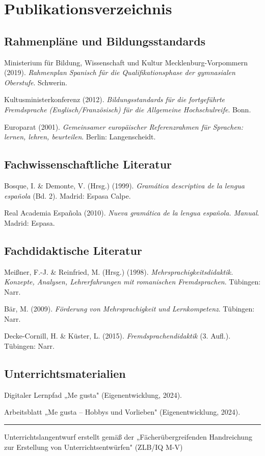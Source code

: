 \documentclass[11pt, a4paper]{article}
\begin{document}

\section{Publikationsverzeichnis}

\subsection*{Rahmenpläne und Bildungsstandards}

Ministerium für Bildung, Wissenschaft und Kultur Mecklenburg-Vorpommern (2019). \textit{Rahmenplan Spanisch für die Qualifikationsphase der gymnasialen Oberstufe}. Schwerin.

Kultusministerkonferenz (2012). \textit{Bildungsstandards für die fortgeführte Fremdsprache (Englisch/Französisch) für die Allgemeine Hochschulreife}. Bonn.

Europarat (2001). \textit{Gemeinsamer europäischer Referenzrahmen für Sprachen: lernen, lehren, beurteilen}. Berlin: Langenscheidt.

\subsection*{Fachwissenschaftliche Literatur}

Bosque, I. \& Demonte, V. (Hrsg.) (1999). \textit{Gramática descriptiva de la lengua española} (Bd. 2). Madrid: Espasa Calpe.

Real Academia Española (2010). \textit{Nueva gramática de la lengua española. Manual}. Madrid: Espasa.

\subsection*{Fachdidaktische Literatur}

Meißner, F.-J. \& Reinfried, M. (Hrsg.) (1998). \textit{Mehrsprachigkeitsdidaktik. Konzepte, Analysen, Lehrerfahrungen mit romanischen Fremdsprachen}. Tübingen: Narr.

Bär, M. (2009). \textit{Förderung von Mehrsprachigkeit und Lernkompetenz}. Tübingen: Narr.

Decke-Cornill, H. \& Küster, L. (2015). \textit{Fremdsprachendidaktik} (3. Aufl.). Tübingen: Narr.

\subsection*{Unterrichtsmaterialien}

Digitaler Lernpfad „Me gusta" (Eigenentwicklung, 2024).

Arbeitsblatt „Me gusta -- Hobbys und Vorlieben" (Eigenentwicklung, 2024).

\vfill

\hrule
\vspace{0.3cm}
\begin{center}
    {\small\color{grau} Unterrichtslangentwurf erstellt gemäß der „Fächerübergreifenden Handreichung zur Erstellung von Unterrichtsentwürfen" (ZLB/IQ M-V)}
\end{center}
\end{document}
